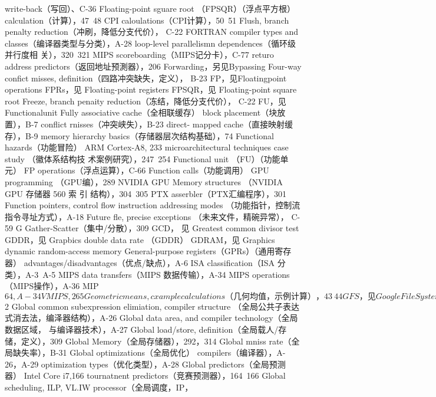 write-back（写回）、C-36
Floating-point sguare root （FPSQR）（浮点平方根）
calculation（计算），47~48
CPI caloulations（CPI计算），50~51
Flush, branch penalty reduction（冲刷，降低分支代价），
C-22
FORTRAN
compiler types and classes（编译器类型与分类），A-28
loop-level parallelismn dependences（循环级并行度相
关），320~321
MIPS scoreboarding（MIPS记分卡），C-77
returo address predictors（返回地址预測器），206
Forwarding，另见Bypassing
Four-way confict misses, definition（四路冲突缺失，定义），
B-23
FP，见Floatingpoint operations
FPRs，见 Floating-point registers
FPSQR，见 Floating-point square root
Freeze, branch penaity reduction（冻结，降低分支代价），
C-22
FU，见Functionalunit
Fully associative cache（全相联缓存）
block placement（块放置），B-7
conflict rnisses（冲突峡失），B-23
direct- mapped cache（直接映射缓存），B-9
memory hierarchy basics（存储器层次结构基础），74
Functional hazards（功能冒险）
ARM Cortex-A8, 233
microarchitectural techniques case study （徽体系结构技
术案例研究），247~254
Functional unit （FU）（功能单元）
FP operations（浮点运算），C-66
Function calls（功能调用）
GPU programming （GPU编），289
NVIDIA GPU Memory structures （NVIDIA GPU 存储器
560
索
引
结构），304~305
PTX asserbler（PTX汇编程序），301
Function pointers, control flow instruction addressing modes
（功能指针，控制流指令寻址方式），A-18
Future fle, precise exceptions （未来文件，精碗异常），
C-59
G
Gather-Scatter（集中/分散），309
GCD， 见 Greatest common divisor test
GDDR，见 Grapbics double data rate （GDDR）
GDRAM，见 Graphics dynamic random-access memory
General-purpose registers（GPRs）（通用寄存器）
advantages/disadvantages（优点/缺点），A-6
ISA classification（ISA 分类），A-3~A-5
MIPS data transfers（MIPS 数据传输），A-34
MIPS operations（MIPS操作），A-36
MIP$64,A-34
VMIPS, 265
Geometric means,cxample calculations（几何均值，示例计
算），43~44
GFS，见 Google File System
Giga Thread Engine, definition（Giga 线程引擎，定义），
292,314
Global address space, segmented virtual memory（全局地址
空间，分段虚拟存储器），B-$2
Global common subexpression elimiation, compiler structure
（全局公共子表达式消去法，编泽器结构），A-26
Global data area, and compiler technology（全局数据区域，
与编译器技术），A-27
Global load/store, definition（全局载人/存储，定义），309
Global Memory（全局存储器），292，314
Global mniss rate（全局缺失率），B-31
Global optimizations（全局优化）
compilers（编译器），A-26，A-29
optimization types（优化类型），A-28
Global predictors（全局预测器）
Intel Core i7,166
tournatnent predictors（竞赛预测器），164~166
Global scheduling, ILP, VL.IW processor（全局调度，IP，
